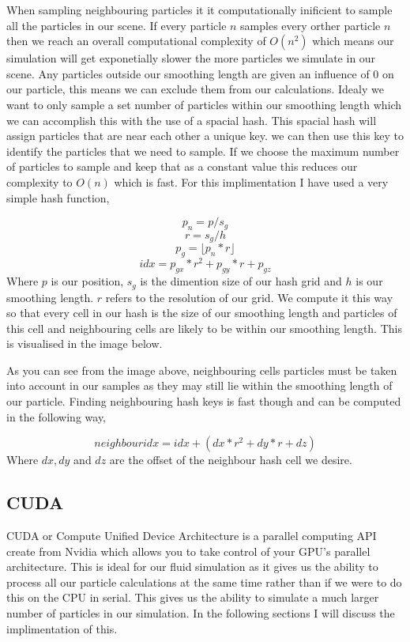 When sampling neighbouring particles it it computationally inificient to sample all the particles in our scene. If every particle $n$ samples every orther particle $n$ then we reach an overall computational complexity of $O(n^2)$ which means our simulation will get exponetially slower the more particles we simulate in our scene. Any particles outside our smoothing length are given an influence of 0 on our particle, this means we can exclude them from our calculations. Idealy we want to only sample a set number of particles within our smoothing length which we can accomplish this with the use of a spacial hash. This spacial hash will assign particles that are near each other a unique key. we can then use this key to identify the particles that we need to sample. If we choose the maximum number of particles to sample and keep that as a constant value this reduces our complexity to $O(n)$ which is fast. For this implimentation I have used a very simple hash function,\par
 \[ p_n = p/s_g \] \[ r = s_g/h \] \[ p_g = \lfloor p_n*r \rfloor \] \[ idx = p_{gx}*r^2 + p_{gy}*r +p_{gz} \] Where $p$ is our position, $s_g$ is the dimention size of our hash grid and $h$ is our smoothing length. $r$ refers to the resolution of our grid. We compute it this way so that every cell in our hash is the size of our smoothing length and particles of this cell and neighbouring cells are likely to be within our smoothing length. This is visualised in the image below.\par
As you can see from the image above, neighbouring cells particles must be taken into account in our samples as they may still lie within the smoothing length of our particle. Finding neighbouring hash keys is fast though and can be computed in the following way,\par
 \[ neighbour idx = idx + (dx*r^2 + dy*r + dz) \] Where $dx,dy$ and $dz$ are the offset of the neighbour hash cell we desire.

\subsection*{C\-U\-D\-A }

C\-U\-D\-A or Compute Unified Device Architecture is a parallel computing A\-P\-I create from Nvidia which allows you to take control of your G\-P\-U's parallel architecture. This is ideal for our fluid simulation as it gives us the ability to process all our particle calculations at the same time rather than if we were to do this on the C\-P\-U in serial. This gives us the ability to simulate a much larger number of particles in our simulation. In the following sections I will discuss the implimentation of this.

